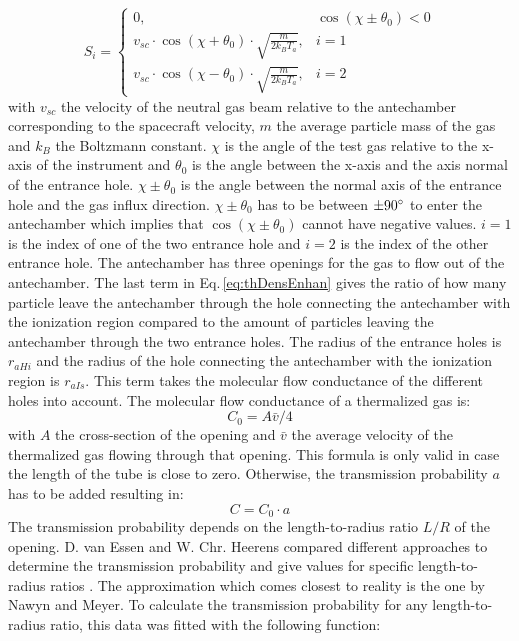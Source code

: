 	\begin{equation}
		S_i = 
		\begin{cases}
			0, & \cos(\chi \pm \theta_0) < 0\\
			v_{sc}\cdot \cos(\chi + \theta_0)\cdot \sqrt{\frac{m}{2k_B T_a}}, & i=1\\
			v_{sc}\cdot \cos(\chi - \theta_0)\cdot \sqrt{\frac{m}{2k_B T_a}}, & i=2
		\end{cases}
	\end{equation}
	with $v_{sc}$ the velocity of the neutral gas beam relative to the antechamber corresponding to the spacecraft velocity, $m$ the average particle mass of the gas and $k_B$ the Boltzmann constant. $\chi$ is the angle of the test gas relative to the x-axis of the instrument and $\theta_0$ is the angle between the x-axis and the axis normal of the entrance hole. $\chi \pm \theta_0$ is the angle between the normal axis of the entrance hole and the gas influx direction. $\chi \pm \theta_0$ has to be between $\pm 90^\circ$ to enter the antechamber which implies that $\cos(\chi \pm \theta_0)$ cannot have negative values. $i=1$ is the index of one of the two entrance hole and $i=2$ is the index of the other entrance hole. The antechamber has three openings for the gas to flow out of the antechamber. The last term in Eq.\,\eqref{eq:thDensEnhan} gives the ratio of how many particle leave the antechamber through the hole connecting the antechamber with the ionization region compared to the amount of particles leaving the antechamber through the two entrance holes. The radius of the entrance holes is $r_{aHi}$ and the radius of the hole connecting the antechamber with the ionization region is $r_{aIs}$. This term takes the molecular flow conductance of the different holes into account. The molecular flow conductance of a thermalized gas is:
	\begin{equation}
		C_0 = A\bar{v}/4
		\label{eq:theoMolFlowCondC0}
	\end{equation}
	with $A$ the cross-section of the opening and $\bar{v}$ the average velocity of the thermalized gas flowing through that opening. This formula is only valid in case the length of the tube is close to zero. Otherwise, the transmission probability $a$ has to be added resulting in:
	\begin{equation}
		C = C_0 \cdot a
		\label{eq:theoMolFlowCondCEff}
	\end{equation}
	The transmission probability depends on the length-to-radius ratio $L/R$ of the opening. D. van Essen and W. Chr. Heerens compared different approaches to determine the transmission probability and give values for specific length-to-radius ratios \cite{molFlowTubeTransm_Essen1976}. The approximation which comes closest to reality is the one by Nawyn and Meyer. To calculate the transmission probability for any length-to-radius ratio, this data was fitted with the following function:
